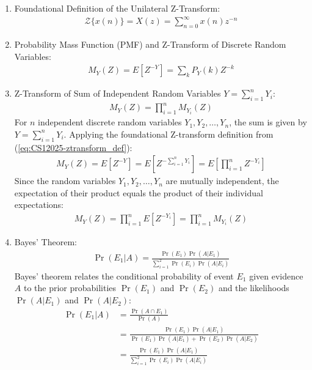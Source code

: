 \begin{enumerate}[label=\thesubsection.\arabic*, ref=\thesubsection.\theenumi, itemsep=0.5cm]

\item Foundational Definition of the Unilateral Z-Transform:
\begin{align}
\mathcal{Z}\{x(n)\} = X(z) = \sum_{n=0}^{\infty} x(n) z^{-n} \label{eq:CS12025-ztransform_def}
\end{align}

\item Probability Mass Function (PMF) and Z-Transform of Discrete Random Variables:
\begin{align}
M_Y(Z) = E[Z^{-Y}] = \sum_k P_Y(k) Z^{-k} \label{eq:CS12025-pmf_ztransform}
\end{align}

\item Z-Transform of Sum of Independent Random Variables $Y = \sum_{i=1}^n Y_i$:
\begin{align}
M_Y(Z) = \prod_{i=1}^n M_{Y_i}(Z) \label{eq:CS12025-ztransform_sum}
\end{align}
\solution
For $n$ independent discrete random variables $Y_1, Y_2, \dots, Y_n$, the sum is given by $Y = \sum_{i=1}^n Y_i$. Applying the foundational Z-transform definition from (\ref{eq:CS12025-ztransform_def}):
\begin{align}
M_Y(Z) = E[Z^{-Y}] = E\left[Z^{-\sum_{i=1}^n Y_i}\right] = E\left[\prod_{i=1}^n Z^{-Y_i}\right]
\end{align}
Since the random variables $Y_1, Y_2, \dots, Y_n$ are mutually independent, the expectation of their product equals the product of their individual expectations:
\begin{align}
M_Y(Z) = \prod_{i=1}^n E[Z^{-Y_i}] = \prod_{i=1}^n M_{Y_i}(Z)
\end{align}

\item Bayes' Theorem:
\begin{align}
\Pr (E_1|A) = \frac{\Pr (E_1) \Pr (A|E_1)}{\sum_{i=1}^2 \Pr (E_i) \Pr (A|E_i)} \label{eq:CS12025-bayes_theorem}
\end{align}
\solution
Bayes' theorem relates the conditional probability of event $E_1$ given evidence $A$ to the prior probabilities $\Pr(E_1)$ and $\Pr(E_2)$ and the likelihoods $\Pr(A|E_1)$ and $\Pr(A|E_2)$:
\begin{align}
\Pr (E_1|A) &= \frac{\Pr(A \cap E_1)}{\Pr(A)} \\
            &= \frac{\Pr (E_1) \Pr (A|E_1)}{\Pr (E_1) \Pr (A|E_1) + \Pr (E_2) \Pr (A|E_2)} \\
            &= \frac{\Pr (E_1) \Pr (A|E_1)}{\sum_{i=1}^2 \Pr (E_i) \Pr (A|E_i)}
\end{align}


\end{enumerate}
